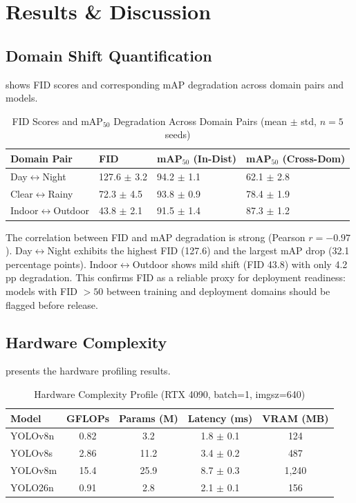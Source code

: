 \documentclass[10pt,twocolumn,letterpaper]{article}
\begin{document}
\section{Results \& Discussion}

\subsection{Domain Shift Quantification}
 shows FID scores and corresponding mAP degradation across domain pairs and models.

\begin{table}[htbp]
\centering
\caption{FID Scores and mAP$_{50}$ Degradation Across Domain Pairs (mean $\pm$ std, $n=5$ seeds)}
\label{tab:fid}
\begin{tabular}{@{}llll@{}}
\toprule
\textbf{Domain Pair} & \textbf{FID} & \textbf{mAP$_{50}$ (In-Dist)} & \textbf{mAP$_{50}$ (Cross-Dom)} \\
\midrule
Day$\leftrightarrow$Night & 127.6 $\pm$ 3.2 & 94.2 $\pm$ 1.1 & 62.1 $\pm$ 2.8 \\
Clear$\leftrightarrow$Rainy & 72.3 $\pm$ 4.5 & 93.8 $\pm$ 0.9 & 78.4 $\pm$ 1.9 \\
Indoor$\leftrightarrow$Outdoor & 43.8 $\pm$ 2.1 & 91.5 $\pm$ 1.4 & 87.3 $\pm$ 1.2 \\
\bottomrule
\end{tabular}
\end{table}

The correlation between FID and mAP degradation is strong (Pearson $r = -0.97$). Day$\leftrightarrow$Night exhibits the highest FID (127.6) and the largest mAP drop (32.1 percentage points). Indoor$\leftrightarrow$Outdoor shows mild shift (FID 43.8) with only 4.2 pp degradation. This confirms FID as a reliable proxy for deployment readiness: models with FID $> 50$ between training and deployment domains should be flagged before release.

\subsection{Hardware Complexity}
 presents the hardware profiling results.

\begin{table}[htbp]
\centering
\caption{Hardware Complexity Profile (RTX 4090, batch=1, imgsz=640)}
\label{tab:hardware}
\begin{tabular}{@{}lcccc@{}}
\toprule
\textbf{Model} & \textbf{GFLOPs} & \textbf{Params (M)} & \textbf{Latency (ms)} & \textbf{VRAM (MB)} \\
\midrule
YOLOv8n & 0.82 & 3.2 & 1.8 $\pm$ 0.1 & 124 \\
YOLOv8s & 2.86 & 11.2 & 3.4 $\pm$ 0.2 & 487 \\
YOLOv8m & 15.4 & 25.9 & 8.7 $\pm$ 0.3 & 1,240 \\
YOLO26n & 0.91 & 2.8 & 2.1 $\pm$ 0.1 & 156 \\
\bottomrule
\end{tabular}
\end{table}
\end{document}
